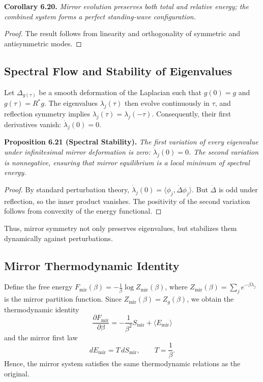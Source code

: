 \noindent
\textbf{Corollary 6.20.}
\emph{Mirror evolution preserves both total and relative energy;
the combined system forms a perfect standing-wave configuration.}

\begin{proof}
The result follows from linearity and orthogonality
of symmetric and antisymmetric modes.
\end{proof}

\subsection{Spectral Flow and Stability of Eigenvalues}\relax \hspace{0pt}

Let \(\Delta_{g(\tau)}\) be a smooth deformation of the Laplacian
such that \(g(0)=g\) and \(g(\tau)=R^{*}g\).
The eigenvalues \(\lambda_j(\tau)\)
then evolve continuously in \(\tau\),
and reflection symmetry implies
\(\lambda_j(\tau)=\lambda_j(-\tau)\).
Consequently, their first derivatives vanish:
\(\dot{\lambda}_j(0)=0\).

\noindent
\textbf{Proposition 6.21 (Spectral Stability).}
\emph{The first variation of every eigenvalue
under infinitesimal mirror deformation is zero:
\(\dot{\lambda}_j(0)=0\).
The second variation is nonnegative,
ensuring that mirror equilibrium is a local minimum of spectral energy.}

\begin{proof}
By standard perturbation theory,
\(\dot{\lambda}_j(0)=\langle\phi_j,\dot{\Delta}\phi_j\rangle\).
But \(\dot{\Delta}\) is odd under reflection,
so the inner product vanishes.
The positivity of the second variation follows
from convexity of the energy functional.
\end{proof}

Thus, mirror symmetry not only preserves eigenvalues,
but stabilizes them dynamically against perturbations.

\subsection{Mirror Thermodynamic Identity}\relax \hspace{0pt}

Define the free energy
\(F_{\mathrm{mir}}(\beta)
=-\frac{1}{\beta}\log Z_{\mathrm{mir}}(\beta)\),
where
\(Z_{\mathrm{mir}}(\beta)
=\sum_{j}e^{-\beta\lambda_j}\)
is the mirror partition function.
Since \(Z_{\mathrm{mir}}(\beta)=Z_g(\beta)\),
we obtain the thermodynamic identity
\[
\frac{\partial F_{\mathrm{mir}}}{\partial \beta}
=-\frac{1}{\beta^{2}}S_{\mathrm{mir}}
+\langle E_{\mathrm{mir}}\rangle
\]
and the mirror first law
\begin{equation}
dE_{\mathrm{mir}}
=T\,dS_{\mathrm{mir}},
\qquad
T=\frac{1}{\beta}.
\end{equation}
Hence, the mirror system satisfies the same
thermodynamic relations as the original.

